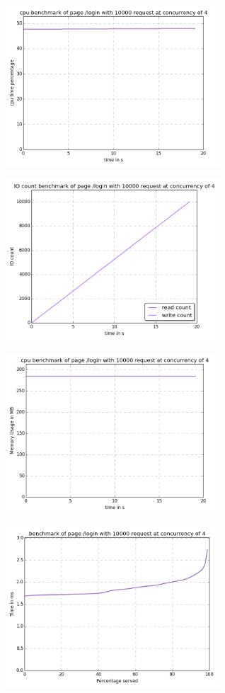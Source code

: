 \begin{center}
\includegraphics[width=0.6\textwidth]{img/login.cpu.png}



\includegraphics[width=0.6\textwidth]{img/login.io-count.png}



\includegraphics[width=0.6\textwidth]{img/login.mem.png}



\includegraphics[width=0.6\textwidth]{img/login.serv-time.png}




\end{center}
